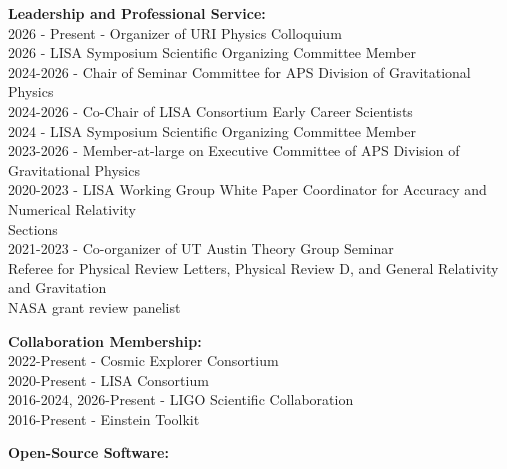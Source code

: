 \documentclass[11pt]{article}
\begin{document}
\begin{flushleft}
  \vspace{8px}

  \textbf{Leadership and Professional Service: }\\
  2026 - Present - Organizer of URI Physics Colloquium\\
  2026 - LISA Symposium Scientific Organizing Committee Member\\
  2024-2026 - Chair of Seminar Committee for APS Division of Gravitational Physics\\
  2024-2026 - Co-Chair of LISA Consortium Early Career Scientists\\
  2024 - LISA Symposium Scientific Organizing Committee Member\\
  2023-2026 - Member-at-large on Executive Committee of APS Division of Gravitational Physics\\
  2020-2023 - LISA Working Group White Paper Coordinator for Accuracy and Numerical Relativity\\ \hspace{58px}Sections \\
  2021-2023 - Co-organizer of UT Austin Theory Group Seminar\\
  Referee for Physical Review Letters, Physical Review D,  and General Relativity and Gravitation\\
  NASA grant review panelist\\
  
  \vspace{8px}  
  
  \textbf{Collaboration Membership: }\\
  2022-Present - Cosmic Explorer Consortium\\
  2020-Present - LISA Consortium\\
  2016-2024, 2026-Present - LIGO Scientific Collaboration\\
  2016-Present - Einstein Toolkit\\
  
  \vspace{8px}
  
  \textbf{Open-Source Software:}\\
  \\
  
  \vspace{8px}


\end{flushleft}
\end{document}
